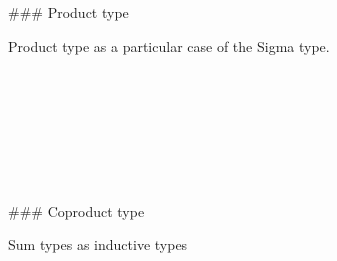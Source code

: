 ### Product type

Product type as a particular case of the Sigma type.

\begin{code}%
\>[0]\<%
\\
\>[0][@{}l@{\AgdaIndent{0}}]%
\>[2]\AgdaSymbol{:}\AgdaSpace{}%
\AgdaSpace{}%
\AgdaSymbol{\{}\AgdaSpace{}%
\AgdaSymbol{\}}\<%
\\
%
\>[2]\AgdaSpace{}%
\AgdaSymbol{(}\AgdaSpace{}%
\AgdaSymbol{:}\AgdaSpace{}%
\AgdaSpace{}%
\AgdaSymbol{)}\AgdaSpace{}%
\AgdaSymbol{(}\AgdaSpace{}%
\AgdaSymbol{:}\AgdaSpace{}%
\AgdaSpace{}%
\AgdaSymbol{)}\<%
\\
%
\>[2]\AgdaComment{----------------------------}\<%
\\
%
\>[2]\AgdaSpace{}%
\AgdaSpace{}%
\AgdaSymbol{(}\AgdaSpace{}%
\AgdaSpace{}%
\AgdaSymbol{)}\<%
\\
%
\\[\AgdaEmptyExtraSkip]%
\>[0]\AgdaSpace{}%
\AgdaSpace{}%
\AgdaSpace{}%
\AgdaSymbol{=}\AgdaSpace{}%
\AgdaSpace{}%
\AgdaSpace{}%
\AgdaSpace{}%
\AgdaBound{\AgdaUnderscore{}}\AgdaSpace{}%
\AgdaSpace{}%
\AgdaSymbol{)}\<%
\end{code}

### Coproduct type

Sum types as inductive types

